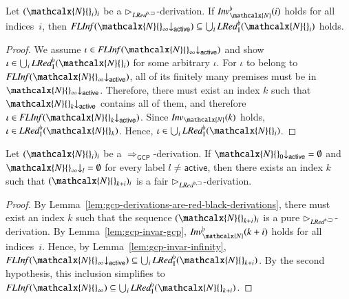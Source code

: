 \begin{rep}
\begin{lemma}
\label{lem:gcp-invar-infinity}
Let $(\mathcalx{N}{}_i)_i$ be a
$\rhd_{\mathit{LRed}^{\flat,\sqsupset}}$-derivation.
If $\Inv\Wksup_\mathcalx{N}(i)$ holds for all indices~$i$, then
$\FLInf(\mathcalx{N}{}_\infty{\downarrow}_\mathsf{active}) \subseteq
\bigcup_i \LRedIWk(\mathcalx{N}{}_i)$
holds.
\end{lemma}

\begin{proof}
We assume $\iota \in \FLInf(\mathcalx{N}{}_\infty {\downarrow}_\mathsf{active})$
and show $\iota \in \bigcup_i \LRedIWk(\mathcalx{N}{}_i)$
for some arbitrary $\iota$.
%
For $\iota$ to belong to $\FLInf(\mathcalx{N}{}_\infty {\downarrow}_\mathsf{active})$, all of
its finitely many premises must be in $\mathcalx{N}{}_\infty {\downarrow}_\mathsf{active}$.
Therefore, there must exist an index $k$ such that
$\mathcalx{N}{}_k {\downarrow}_\mathsf{active}$ contains all of them, and therefore
$\iota \in \FLInf(\mathcalx{N}{}_k {\downarrow}_\mathsf{active})$. Since $\Inv_\mathcalx{N}(k)$
holds, $\iota \in \LRedIWk(\mathcalx{N}{}_k)$.
Hence, $\iota \in \bigcup_i \LRedIWk(\mathcalx{N}{}_i)$.
\end{proof}

\begin{lemma}
\label{lem:fair-gcp-derivations}
Let $(\mathcalx{N}{}_i)_i$ be a $\Longrightarrow_\mathsf{GCP}$-derivation.
If
$\mathcalx{N}{}_0{\downarrow}_\mathsf{active} = \emptyset$
and
$\mathcalx{N}{}_\infty{\downarrow}_l = \emptyset$ for every label
$l \not= \ensuremath{\mathsf{active}}$,
then there exists an index $k$ such that
$(\mathcalx{N}{}_{k+i})_i$ is a fair $\rhd_{\mathit{LRed}^{\flat,\sqsupset}}$-derivation.
\end{lemma}

\begin{sloppypar}
\begin{proof}
By Lemma~\ref{lem:gcp-derivations-are-red-black-derivations}, there must exist
an index $k$ such that the sequence $(\mathcalx{N}{}_{k+i})_i$ is a pure
$\rhd_{\mathit{LRed}^{\flat,\sqsupset}}$-derivation.
By Lemma~\ref{lem:gcp-invar-gcp},
$\Inv\Wksup_\mathcalx{N}(k+i)$ holds for all indices~$i$.
Hence, by Lemma~\ref{lem:gcp-invar-infinity},
$\FLInf(\mathcalx{N}{}_\infty{\downarrow}_\mathsf{active}) \subseteq
\bigcup_{i} \LRedIWk(\mathcalx{N}{}_{k+i})$.
By the second hypothesis, this inclusion simplifies to
$\FLInf(\mathcalx{N}{}_\infty) \subseteq
\bigcup_{i} \LRedIWk(\mathcalx{N}{}_{k+i})$.
\end{proof}
\end{sloppypar}


\end{rep}

